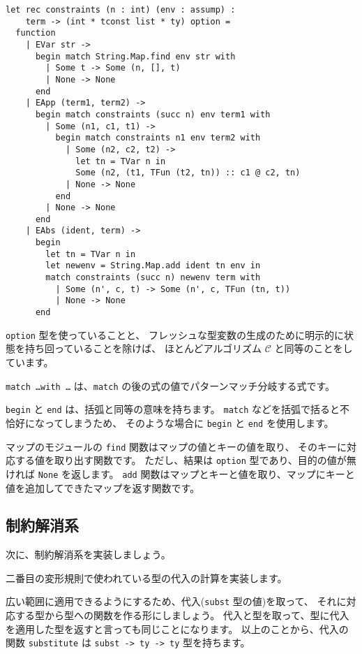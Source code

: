 \begin{lstlisting}[caption=方程式の生成, label=list:ocaml-stlc-constraints]
let rec constraints (n : int) (env : assump) :
    term -> (int * tconst list * ty) option =
  function
    | EVar str ->
      begin match String.Map.find env str with
        | Some t -> Some (n, [], t)
        | None -> None
      end
    | EApp (term1, term2) ->
      begin match constraints (succ n) env term1 with
        | Some (n1, c1, t1) ->
          begin match constraints n1 env term2 with
            | Some (n2, c2, t2) ->
              let tn = TVar n in
              Some (n2, (t1, TFun (t2, tn)) :: c1 @ c2, tn)
            | None -> None
          end
        | None -> None
      end
    | EAbs (ident, term) ->
      begin
        let tn = TVar n in
        let newenv = String.Map.add ident tn env in
        match constraints (succ n) newenv term with
          | Some (n', c, t) -> Some (n', c, TFun (tn, t))
          | None -> None
      end
\end{lstlisting}

\texttt{option} 型を使っていることと、
フレッシュな型変数の生成のために明示的に状態を持ち回っていることを除けば、
ほとんどアルゴリズム $\mathcal C$ と同等のことをしています。

\texttt{match \dots with \dots} は、\texttt{match} の後の式の値でパターンマッチ分岐する式です。

\texttt{begin} と \texttt{end} は、括弧と同等の意味を持ちます。
\texttt{match} などを括弧で括ると不恰好になってしまうため、
そのような場合に \texttt{begin} と \texttt{end} を使用します。

マップのモジュールの \texttt{find} 関数はマップの値とキーの値を取り、
そのキーに対応する値を取り出す関数です。
ただし、結果は \texttt{option} 型であり、目的の値が無ければ \texttt{None} を返します。
\texttt{add} 関数はマップとキーと値を取り、マップにキーと値を追加してできたマップを返す関数です。

\subsection{制約解消系}

次に、制約解消系を実装しましょう。

二番目の変形規則で使われている型の代入の計算を実装します。

広い範囲に適用できるようにするため、代入(\texttt{subst} 型の値)を取って、
それに対応する型から型への関数を作る形にしましょう。
代入と型を取って、型に代入を適用した型を返すと言っても同じことになります。
以上のことから、代入の関数 \texttt{substitute} は \texttt{subst -> ty -> ty} 型を持ちます。

